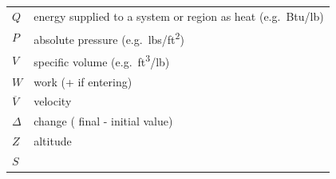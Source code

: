 \documentclass[
]{book}
\begin{document}
\begin{longtable}[]{@{}ll@{}}
\begin{minipage}[t]{0.58\columnwidth}
\(Q\)\strut
\end{minipage} & \begin{minipage}[t]{0.36\columnwidth}\raggedright
energy supplied to a system or region as heat (e.g.~Btu/lb)\strut
\end{minipage}\tabularnewline
\begin{minipage}[t]{0.58\columnwidth}\raggedright
\(P\)\strut
\end{minipage} & \begin{minipage}[t]{0.36\columnwidth}\raggedright
absolute pressure (e.g.~lbs/ft\textsuperscript{2})\strut
\end{minipage}\tabularnewline
\begin{minipage}[t]{0.58\columnwidth}\raggedright
\(V\)\strut
\end{minipage} & \begin{minipage}[t]{0.36\columnwidth}\raggedright
specific volume (e.g.~ft\textsuperscript{3}/lb)\strut
\end{minipage}\tabularnewline
\begin{minipage}[t]{0.58\columnwidth}\raggedright
\(W\)\strut
\end{minipage} & \begin{minipage}[t]{0.36\columnwidth}\raggedright
work (+ if entering)\strut
\end{minipage}\tabularnewline
\begin{minipage}[t]{0.58\columnwidth}\raggedright
\(\overline{V}\)\strut
\end{minipage} & \begin{minipage}[t]{0.36\columnwidth}\raggedright
velocity\strut
\end{minipage}\tabularnewline
\begin{minipage}[t]{0.58\columnwidth}\raggedright
\(\Delta\)\strut
\end{minipage} & \begin{minipage}[t]{0.36\columnwidth}\raggedright
change ( final - initial value)\strut
\end{minipage}\tabularnewline
\begin{minipage}[t]{0.58\columnwidth}\raggedright
\(Z\)\strut
\end{minipage} & \begin{minipage}[t]{0.36\columnwidth}\raggedright
altitude\strut
\end{minipage}\tabularnewline
\begin{minipage}[t]{0.58\columnwidth}\raggedright
\(S\)\strut
\end{minipage} & \begin{minipage}[t]{0.36\columnwidth}\raggedright

\end{minipage}
\end{longtable}
\end{document}
